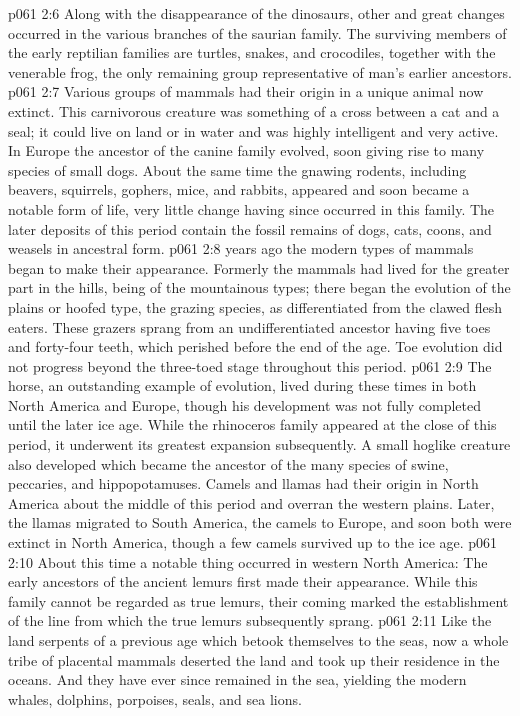 \vs p061 2:6 Along with the disappearance of the dinosaurs, other and great changes occurred in the various branches of the saurian family. The surviving members of the early reptilian families are turtles, snakes, and crocodiles, together with the venerable frog, the only remaining group representative of man’s earlier ancestors.
\vs p061 2:7 Various groups of mammals had their origin in a unique animal now extinct. This carnivorous creature was something of a cross between a cat and a seal; it could live on land or in water and was highly intelligent and very active. In Europe the ancestor of the canine family evolved, soon giving rise to many species of small dogs. About the same time the gnawing rodents, including beavers, squirrels, gophers, mice, and rabbits, appeared and soon became a notable form of life, very little change having since occurred in this family. The later deposits of this period contain the fossil remains of dogs, cats, coons, and weasels in ancestral form.
\pc \vs p061 2:8  years ago the modern types of mammals began to make their appearance. Formerly the mammals had lived for the greater part in the hills, being of the mountainous types;  there began the evolution of the plains or hoofed type, the grazing species, as differentiated from the clawed flesh eaters. These grazers sprang from an undifferentiated ancestor having five toes and forty\hyp{}four teeth, which perished before the end of the age. Toe evolution did not progress beyond the three\hyp{}toed stage throughout this period.
\vs p061 2:9 The horse, an outstanding example of evolution, lived during these times in both North America and Europe, though his development was not fully completed until the later ice age. While the rhinoceros family appeared at the close of this period, it underwent its greatest expansion subsequently. A small hoglike creature also developed which became the ancestor of the many species of swine, peccaries, and hippopotamuses. Camels and llamas had their origin in North America about the middle of this period and overran the western plains. Later, the llamas migrated to South America, the camels to Europe, and soon both were extinct in North America, though a few camels survived up to the ice age.
\vs p061 2:10 About this time a notable thing occurred in western North America: The early ancestors of the ancient lemurs first made their appearance. While this family cannot be regarded as true lemurs, their coming marked the establishment of the line from which the true lemurs subsequently sprang.
\vs p061 2:11 Like the land serpents of a previous age which betook themselves to the seas, now a whole tribe of placental mammals deserted the land and took up their residence in the oceans. And they have ever since remained in the sea, yielding the modern whales, dolphins, porpoises, seals, and sea lions.
